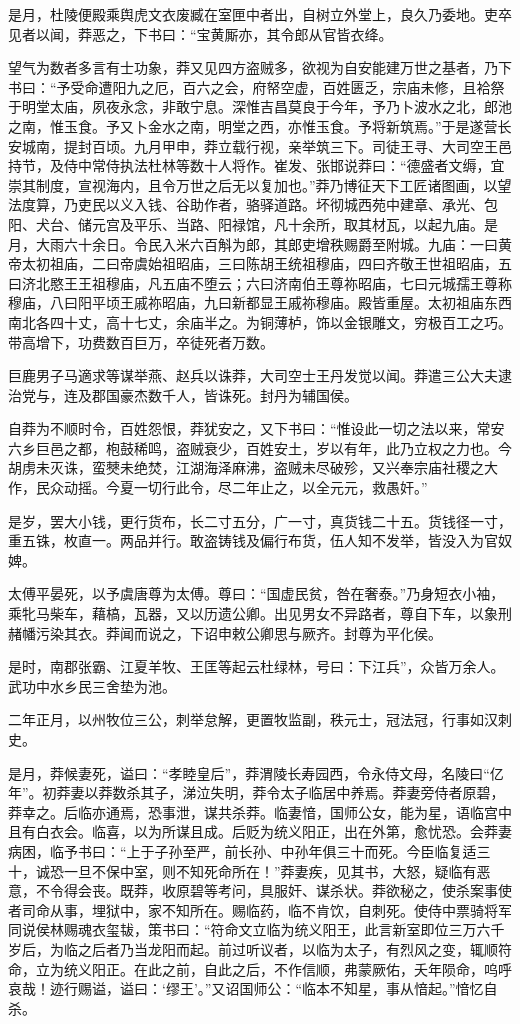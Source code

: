 \documentclass[]{article}
\begin{document}
是月，杜陵便殿乘舆虎文衣废臧在室匣中者出，自树立外堂上，良久乃委地。吏卒见者以闻，莽恶之，下书曰：``宝黄厮亦，其令郎从官皆衣绛。

望气为数者多言有士功象，莽又见四方盗贼多，欲视为自安能建万世之基者，乃下书曰：``予受命遭阳九之厄，百六之会，府帑空虚，百姓匮乏，宗庙未修，且袷祭于明堂太庙，夙夜永念，非敢宁息。深惟吉昌莫良于今年，予乃卜波水之北，郎池之南，惟玉食。予又卜金水之南，明堂之西，亦惟玉食。予将新筑焉。''于是遂营长安城南，提封百顷。九月甲申，莽立载行视，亲举筑三下。司徒王寻、大司空王邑持节，及侍中常侍执法杜林等数十人将作。崔发、张邯说莽曰：``德盛者文缛，宜崇其制度，宣视海内，且令万世之后无以复加也。''莽乃博征天下工匠诸图画，以望法度算，乃吏民以义入钱、谷助作者，骆驿道路。坏彻城西苑中建章、承光、包阳、犬台、储元宫及平乐、当路、阳禄馆，凡十余所，取其材瓦，以起九庙。是月，大雨六十余日。令民入米六百斛为郎，其郎吏增秩赐爵至附城。九庙：一曰黄帝太初祖庙，二曰帝虞始祖昭庙，三曰陈胡王统祖穆庙，四曰齐敬王世祖昭庙，五曰济北愍王王祖穆庙，凡五庙不堕云；六曰济南伯王尊祢昭庙，七曰元城孺王尊称穆庙，八曰阳平顷王戚祢昭庙，九曰新都显王戚祢穆庙。殿皆重屋。太初祖庙东西南北各四十丈，高十七丈，余庙半之。为铜薄栌，饰以金银雕文，穷极百工之巧。带高增下，功费数百巨万，卒徒死者万数。

巨鹿男子马適求等谋举燕、赵兵以诛莽，大司空士王丹发觉以闻。莽遣三公大夫逮治党与，连及郡国豪杰数千人，皆诛死。封丹为辅国侯。

自莽为不顺时令，百姓怨恨，莽犹安之，又下书曰：``惟设此一切之法以来，常安六乡巨邑之都，枹鼓稀鸣，盗贼衰少，百姓安土，岁以有年，此乃立权之力也。今胡虏未灭诛，蛮僰未绝焚，江湖海泽麻沸，盗贼未尽破殄，又兴奉宗庙社稷之大作，民众动摇。今夏一切行此令，尽二年止之，以全元元，救愚奸。''

是岁，罢大小钱，更行货布，长二寸五分，广一寸，真货钱二十五。货钱径一寸，重五铢，枚直一。两品并行。敢盗铸钱及偏行布货，伍人知不发举，皆没入为官奴婢。

太傅平晏死，以予虞唐尊为太傅。尊曰：``国虚民贫，咎在奢泰。''乃身短衣小袖，乘牝马柴车，藉槁，瓦器，又以历遗公卿。出见男女不异路者，尊自下车，以象刑赭幡污染其衣。莽闻而说之，下诏申敕公卿思与厥齐。封尊为平化侯。

是时，南郡张霸、江夏羊牧、王匡等起云杜绿林，号曰：下江兵''，众皆万余人。武功中水乡民三舍垫为池。

二年正月，以州牧位三公，刺举怠解，更置牧监副，秩元士，冠法冠，行事如汉刺史。

是月，莽候妻死，谥曰：``孝睦皇后''，莽渭陵长寿园西，令永侍文母，名陵曰``亿年''。初莽妻以莽数杀其子，涕泣失明，莽令太子临居中养焉。莽妻旁侍者原碧，莽幸之。后临亦通焉，恐事泄，谋共杀莽。临妻愔，国师公女，能为星，语临宫中且有白衣会。临喜，以为所谋且成。后贬为统义阳正，出在外第，愈忧恐。会莽妻病困，临予书曰：``上于子孙至严，前长孙、中孙年俱三十而死。今臣临复适三十，诚恐一旦不保中室，则不知死命所在！''莽妻疾，见其书，大怒，疑临有恶意，不令得会丧。既莽，收原碧等考问，具服奸、谋杀状。莽欲秘之，使杀案事使者司命从事，埋狱中，家不知所在。赐临药，临不肯饮，自刺死。使侍中票骑将军同说侯林赐魂衣玺韨，策书曰：``符命文立临为统义阳王，此言新室即位三万六千岁后，为临之后者乃当龙阳而起。前过听议者，以临为太子，有烈风之变，辄顺符命，立为统义阳正。在此之前，自此之后，不作信顺，弗蒙厥佑，夭年陨命，呜呼哀哉！迹行赐谥，谥曰：`缪王'。''又诏国师公：``临本不知星，事从愔起。''愔忆自杀。
\end{document}
